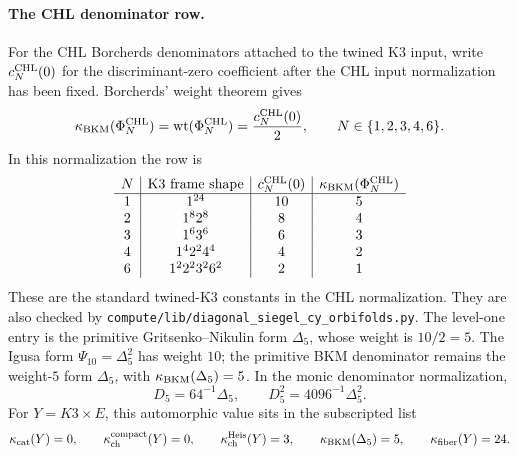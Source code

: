 \paragraph{The CHL denominator row.}
For the CHL Borcherds denominators attached to the twined K3 input,
write \(c_N^{\mathrm{CHL}}(0)\) for the discriminant-zero coefficient after the
CHL input normalization has been fixed.  Borcherds' weight theorem gives
\[
  \kappa_{\mathrm{BKM}}(\Phi_N^{\mathrm{CHL}})
  =\operatorname{wt}(\Phi_N^{\mathrm{CHL}})
  =\frac{c_N^{\mathrm{CHL}}(0)}{2},
  \qquad N\in\{1,2,3,4,6\}.
\]
In this normalization the row is
\[
\begin{array}{c|c|c|c}
N & \text{K3 frame shape} & c_N^{\mathrm{CHL}}(0) &
\kappa_{\mathrm{BKM}}(\Phi_N^{\mathrm{CHL}})\\
\hline
1 & 1^{24} & 10 & 5\\
2 & 1^{8}2^{8} & 8 & 4\\
3 & 1^{6}3^{6} & 6 & 3\\
4 & 1^{4}2^{2}4^{4} & 4 & 2\\
6 & 1^{2}2^{2}3^{2}6^{2} & 2 & 1
\end{array}
\]
These are the standard twined-K3 constants in the CHL normalization.
They are also checked by
\texttt{compute/lib/diagonal\_siegel\_cy\_orbifolds.py}.  The level-one entry is
the primitive Gritsenko--Nikulin form \(\Delta_5\), whose weight is
\(10/2=5\).  The Igusa form \(\Psi_{10}=\Delta_5^2\) has weight \(10\);
the primitive BKM denominator remains the weight-\(5\) form
\(\Delta_5\), with \(\kappa_{\mathrm{BKM}}(\Delta_5)=5\).  In the monic denominator
normalization,
\[
  D_5=64^{-1}\Delta_5,\qquad D_5^2=4096^{-1}\Delta_5^2 .
\]
For \(Y=K3\times E\), this automorphic value sits in the subscripted
list
\[
  \kappa_{\mathrm{cat}}(Y)=0,\qquad
  \kappa_{\mathrm{ch}}^{\mathrm{compact}}(Y)=0,\qquad
  \kappa_{\mathrm{ch}}^{\mathrm{Heis}}(Y)=3,\qquad
  \kappa_{\mathrm{BKM}}(\Delta_5)=5,\qquad
  \kappa_{\mathrm{fiber}}(Y)=24 .
\]

